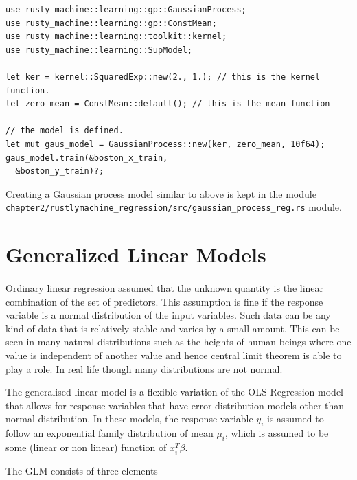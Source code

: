 \documentclass{book}
\begin{document}
\begin{lstlisting}[caption={gaussian\_process\_reg\\.rs}]
use rusty_machine::learning::gp::GaussianProcess;
use rusty_machine::learning::gp::ConstMean;
use rusty_machine::learning::toolkit::kernel;
use rusty_machine::learning::SupModel;

let ker = kernel::SquaredExp::new(2., 1.); // this is the kernel function.
let zero_mean = ConstMean::default(); // this is the mean function

// the model is defined.
let mut gaus_model = GaussianProcess::new(ker, zero_mean, 10f64);
gaus_model.train(&boston_x_train,
  &boston_y_train)?;
\end{lstlisting}

Creating a Gaussian process model similar to above is kept in the module \lstinline{chapter2/rustlymachine_regression/src/gaussian_process_reg.rs} module.

\label{sub:gaussian_process}

\section{Generalized Linear Models}%
\paragraph{}%
Ordinary linear regression assumed that the unknown quantity is the linear combination of the set of predictors. This assumption is fine if the response variable is a normal distribution of the input variables. Such data can be any kind of data that is relatively stable and varies by a small amount. This can be seen in many natural distributions such as the heights of human beings where one value is independent of another value and hence central limit theorem is able to play a role. In real life though many distributions are not normal.

The generalised linear model is a flexible variation of the OLS Regression model that allows for response variables that have error distribution models other than normal distribution. In these models, the response variable $y_i$ is assumed to follow an exponential family distribution of mean $\mu_i$, which is assumed to be some (linear or non linear) function of $x_i^T\beta$\cite{WEBSITE:2}.

The GLM consists of three elements\cite{WEBSITE:3} 
\end{document}
